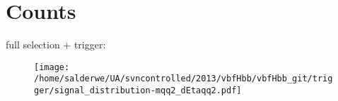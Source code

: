 \documentclass[12pt,english,dvipsnames]{beamer}
\newcommand{\UAoverlay}[0]{%
\begin{tikzpicture}[remember picture,overlay,shift={(current page.north east)}]
\node (zero) at (-1.8cm,-0.93cm) {\texttt{[image: ../logos/CMS.pdf]}\hspace{0.15cm}\texttt{[image: ../logos/CERN.pdf]}\hspace{0.15cm}\texttt{[image: ../logos/UA.pdf]}}; 
\end{tikzpicture}
}
\begin{document}
\section{\footnotesize Counts}
\begin{frame}[t,fragile]%
\footnotesize
full selection + trigger: 

\begin{figure}\centering\texttt{[image: /home/salderwe/UA/svncontrolled/2013/vbfHbb/vbfHbb\_git/trigger/signal\_distribution-mqq2\_dEtaqq2.pdf]}\end{figure}


\end{frame}
\end{document}
